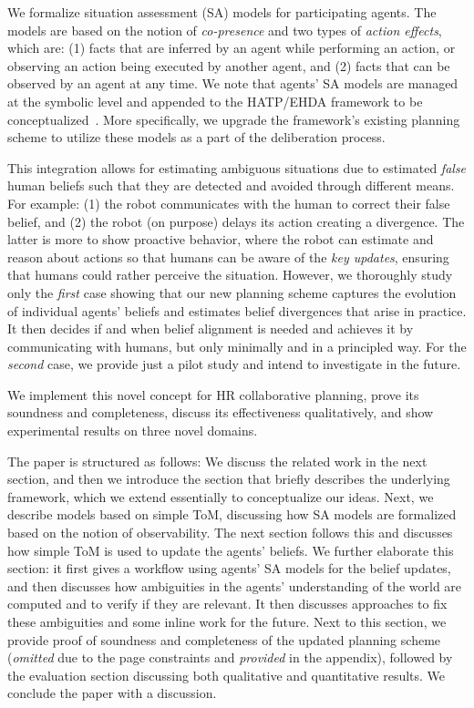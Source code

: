 \documentclass[letterpaper]{article} %
\begin{document}
We formalize situation assessment (SA) models for participating agents. 
The models are based on the notion of {\em co-presence} and two types of \textit{action effects}, which are: (1) facts that are inferred by an agent while performing an action, or observing an action being executed by another agent, and (2) facts that can be observed by an agent at any time.
We note that agents' SA models are managed at the symbolic level and appended to the HATP/EHDA framework to be conceptualized~\cite{buisan:hal-03684211}. 
More specifically, we upgrade the framework's existing planning scheme to utilize these models as a part of the deliberation process.   

This integration allows for estimating ambiguous situations due to estimated \textit{false} human beliefs such that they are detected and avoided through different means. 
For example: (1) the robot communicates with the human to correct their false belief, and (2) the robot (on purpose) delays its action creating a divergence.
The latter is more to show proactive behavior, where the robot can estimate and reason about actions so that humans can be aware of the {\em key updates}, ensuring that humans could rather perceive the situation. 
However, we thoroughly study only the \textit{first} case showing that our new planning scheme captures the evolution of individual agents' beliefs and estimates belief divergences that arise in practice. 
It then decides if and when belief alignment is needed and achieves it by communicating with humans, but only minimally and in a principled way. 
For the \textit{second} case, we provide just a pilot study and intend to investigate in the future.   

We implement this novel concept for HR collaborative planning, prove its soundness and completeness, discuss its effectiveness qualitatively, and show experimental results on three novel domains. 

The paper is structured as follows: 
We discuss the related work in the next section, and then we introduce the section that briefly describes the underlying framework, which we extend essentially to conceptualize our ideas. Next, we describe models based on simple ToM, discussing how SA models are formalized based on the notion of observability. The next section follows this and discusses how simple ToM is used to update the agents' beliefs. 
We further elaborate this section: it first gives a workflow using agents' SA models for the belief updates, and then discusses how ambiguities in the agents' understanding of the world are computed and to verify if they are relevant.
It then discusses approaches to fix these ambiguities and some inline work for the future.
Next to this section, we provide proof of soundness and completeness of the updated planning scheme ({\em omitted} due to the page constraints and {\em provided} in the appendix), followed by the evaluation section discussing both qualitative and quantitative results. 
We conclude the paper with a discussion.  
\end{document}
